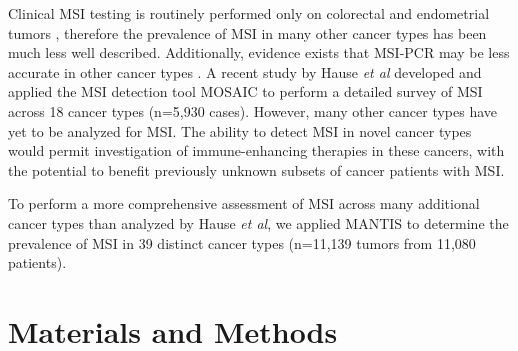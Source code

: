 Clinical MSI testing is routinely performed only on colorectal and endometrial tumors \cite{giardiello2014}, therefore the prevalence of MSI in many other cancer types has been much less well described. Additionally, evidence exists that MSI-PCR may be less accurate in other cancer types \cite{faulkner2004}. A recent study by Hause \textit{et al} \cite{hause2016} developed and applied the MSI detection tool MOSAIC to perform a detailed survey of MSI across 18 cancer types (n=5,930 cases). However, many other cancer types have yet to be analyzed for MSI\@. The ability to detect MSI in novel cancer types would permit investigation of immune-enhancing therapies in these cancers, with the potential to benefit previously unknown subsets of cancer patients with MSI\@.

To perform a more comprehensive assessment of MSI across many additional cancer types than analyzed by Hause \textit{et al}, we applied MANTIS to determine the prevalence of MSI in 39 distinct cancer types (n=11,139 tumors from 11,080 patients).

\section{Materials and Methods}

